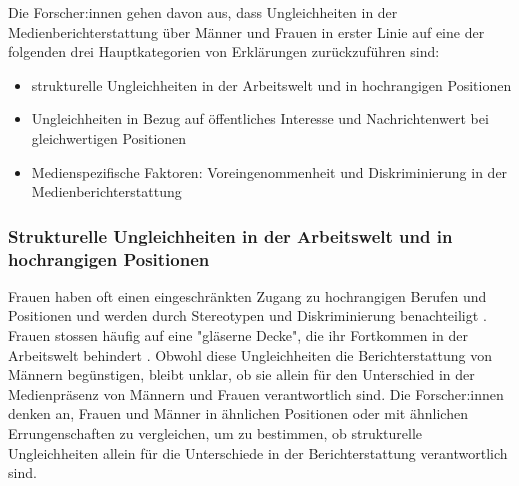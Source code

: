 

Die Forscher:innen gehen davon aus, dass Ungleichheiten in der Medienberichterstattung über Männer und Frauen in erster Linie 
auf eine der folgenden drei Hauptkategorien von Erklärungen zurückzuführen sind:
\begin{itemize}
    \item strukturelle Ungleichheiten in der Arbeitswelt und in hochrangigen Positionen 
    \item Ungleichheiten in Bezug auf öffentliches Interesse und Nachrichtenwert bei gleichwertigen Positionen
    \item Medienspezifische Faktoren: Voreingenommenheit und Diskriminierung in der Medienberichterstattung
\end{itemize}

\subsubsection{Strukturelle Ungleichheiten in der Arbeitswelt und in hochrangigen Positionen}
Frauen haben oft einen eingeschränkten Zugang zu hochrangigen Berufen und Positionen und werden durch Stereotypen und Diskriminierung benachteiligt \cite{glass_ceiling_politics}.
Frauen stossen häufig auf eine "gläserne Decke", die ihr Fortkommen in der Arbeitswelt behindert
\cite{glass_ceiling_effect,glass_ceiling_politics,president_glass_ceiling}.
Obwohl diese Ungleichheiten die Berichterstattung von Männern begünstigen, bleibt unklar, ob sie allein für 
den Unterschied in der Medienpräsenz von Männern und Frauen verantwortlich sind. 
Die Forscher:innen denken an, Frauen und Männer in ähnlichen Positionen oder mit ähnlichen Errungenschaften zu vergleichen, 
um zu bestimmen, ob strukturelle Ungleichheiten allein für die Unterschiede in der Berichterstattung verantwortlich sind.

